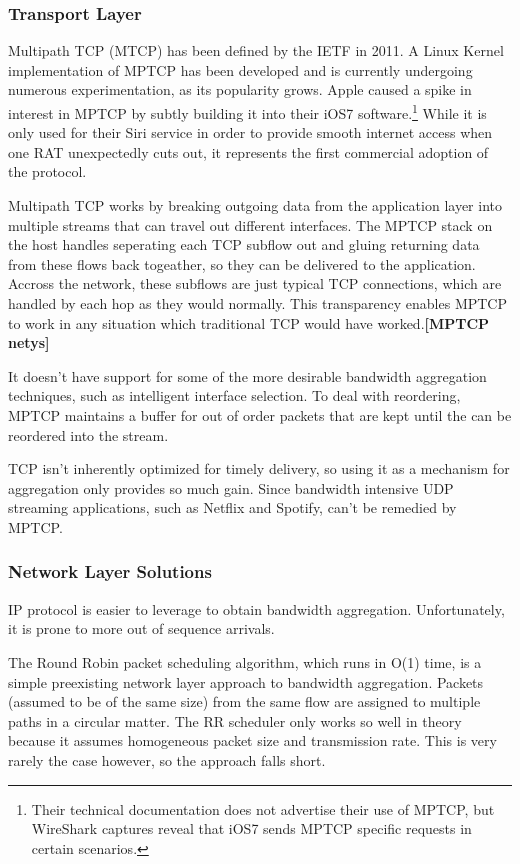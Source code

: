 \documentclass[12pt]{article}
\newcommand{\lcite}[1]
{{\bfseries\color{orange}[#1]}}
\begin{document}
		\subsubsection{Transport Layer}
			Multipath TCP (MTCP) has been defined by the IETF in 2011. A Linux Kernel implementation of MPTCP has been developed and is currently undergoing numerous experimentation, as its popularity grows. Apple caused a spike in interest in MPTCP by subtly building it into their iOS7 software.\footnote{Their technical documentation does not advertise their use of MPTCP, but WireShark captures reveal that iOS7 sends MPTCP specific requests in certain scenarios.} While it is only used for their Siri service in order to provide smooth internet access when one RAT unexpectedly cuts out, it represents the first commercial adoption of the protocol. 

			Multipath TCP works by breaking outgoing data from the application layer into multiple streams that can travel out different interfaces. The MPTCP stack on the host handles seperating each TCP subflow out and gluing returning data from these flows back togeather, so they can be delivered to the application. Accross the network, these subflows are just typical TCP connections, which are handled by each hop as they would normally. This transparency enables MPTCP to work in any situation which traditional TCP would have worked.\lcite{MPTCP netys}

			It doesn't have support for some of the more desirable bandwidth aggregation techniques, such as intelligent interface selection. To deal with reordering, MPTCP maintains a buffer for out of order packets that are kept until the can be reordered into the stream. 

			TCP isn't inherently optimized for timely delivery, so using it as a mechanism for aggregation only provides so much gain. Since bandwidth intensive UDP streaming applications, such as Netflix and Spotify, can't be remedied by MPTCP.

		\subsubsection{Network Layer Solutions}

			IP protocol is easier to leverage to obtain bandwidth aggregation. Unfortunately, it is prone to more out of sequence arrivals.

			The Round Robin packet scheduling algorithm, which runs in O(1) time, is a simple preexisting network layer approach to bandwidth aggregation. Packets (assumed to be of the same size) from the same flow are assigned to multiple paths in a circular matter. The RR scheduler only works so well in theory because it assumes homogeneous packet size and transmission rate. This is very rarely the case however, so the approach falls short.
\end{document}
